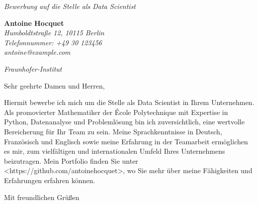 \documentclass[12pt]{letter}
\begin{document}
\begin{letter}{ \itshape Bewerbung auf die Stelle als Data Scientist }
\hfill
\begin{flushleft}
    {\bfseries Antoine Hocquet }\\[.35ex]
    \small\itshape
    Humboldtstraße 12, 10115 Berlin\\
    Telefonnummer: +49 30 123456\\
    antoine@example.com
\end{flushleft}

\hfill
\begin{flushright}
    \itshape Fraunhofer-Institut \\
\end{flushright}

\opening{ Sehr geehrte Damen und Herren, }

Hiermit bewerbe ich mich um die Stelle als Data Scientist in Ihrem Unternehmen. Als promovierter Mathematiker der École Polytechnique mit Expertise in Python, Datenanalyse und Problemlösung bin ich zuversichtlich, eine wertvolle Bereicherung für Ihr Team zu sein. Meine Sprachkenntnisse in Deutsch, Französisch und Englisch sowie meine Erfahrung in der Teamarbeit ermöglichen es mir, zum vielfältigen und internationalen Umfeld Ihres Unternehmens beizutragen.  Mein Portfolio finden Sie unter <https://github.com/antoinehocquet>, wo Sie mehr über meine Fähigkeiten und Erfahrungen erfahren können.

\closing{ Mit freundlichen Grüßen }

\end{letter}
\end{document}
